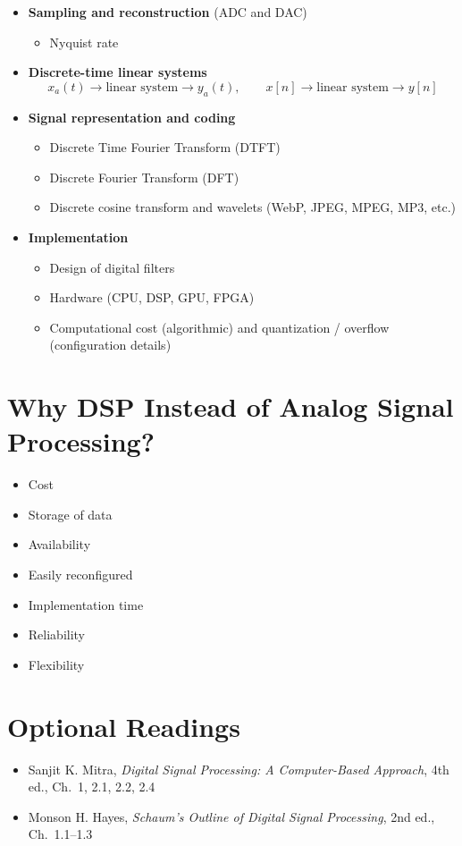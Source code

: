 \documentclass[handout_subfiles_root.tex]{subfiles}
\begin{document}
\begin{itemize}
  \item \textbf{Sampling and reconstruction} (ADC and DAC)
  \begin{itemize}
    \item Nyquist rate
  \end{itemize}
  \item \textbf{Discrete-time linear systems}
  $$x_a(t) \to \boxed{\text{linear system}} \to y_a(t), \qquad
    x[n] \to \boxed{\text{linear system}} \to y[n]$$
  \item \textbf{Signal representation and coding}
  \begin{itemize}
    \item Discrete Time Fourier Transform (DTFT)
    \item Discrete Fourier Transform (DFT)
    \item Discrete cosine transform and wavelets (WebP, JPEG, MPEG, MP3, etc.)
  \end{itemize}
  \item \textbf{Implementation}
  \begin{itemize}
    \item Design of digital filters
    \item Hardware (CPU, DSP, GPU, FPGA)
    \item Computational cost (algorithmic) and quantization / overflow
    (configuration details)
  \end{itemize}
\end{itemize}

\section{Why DSP Instead of Analog Signal Processing?}

\begin{itemize}
  \item Cost
  \item Storage of data
  \item Availability
  \item Easily reconfigured
  \item Implementation time
  \item Reliability
  \item Flexibility
\end{itemize}

\section*{Optional Readings}
\begin{itemize}
  \item Sanjit K. Mitra, \textit{Digital Signal Processing: A Computer-Based Approach}, 4th ed., Ch.\ 1, 2.1, 2.2, 2.4
  \item Monson H. Hayes, \textit{Schaum's Outline of Digital Signal Processing}, 2nd ed., Ch.\ 1.1--1.3
\end{itemize}

\HandoutAppendixListStart
\HandoutAppendixListEnd

\end{document}
